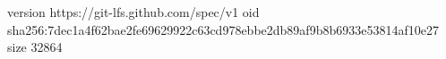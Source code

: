 version https://git-lfs.github.com/spec/v1
oid sha256:7dec1a4f62bae2fe69629922c63cd978ebbe2db89af9b8b6933e53814af10e27
size 32864
